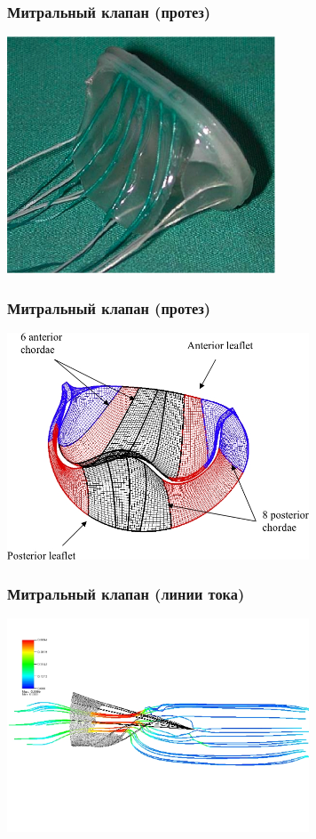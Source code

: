 \documentclass[14pt]{beamer}
\begin{document}
\begin{frame}
\frametitle{Митральный клапан (протез)}
    \begin{center}
    \includegraphics[width=8cm]{immersed_boundary/prosthetic_MV.jpeg}
    \end{center}
\end{frame}

\begin{frame}
\frametitle{Митральный клапан (протез)}
    \begin{center}
    \includegraphics[width=9cm]{immersed_boundary/MV_mesh.jpeg}
    \end{center}
\end{frame}

\begin{frame}
\frametitle{Митральный клапан (линии тока)}
    \begin{center}
    \includegraphics[width=9cm]{immersed_boundary/MV_streamline_0030.jpeg}
    \end{center}
\end{frame}
\end{document}
